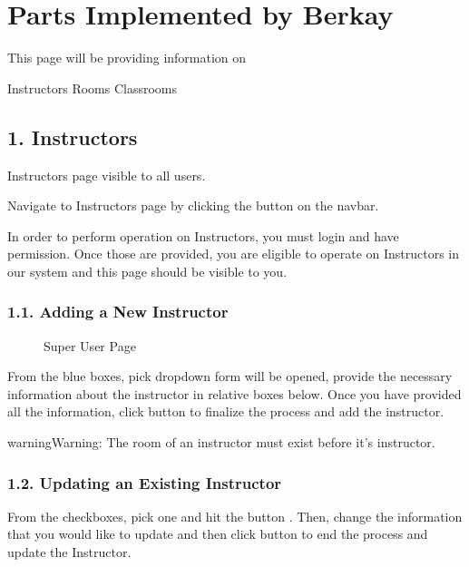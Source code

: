 \documentclass[letterpaper,10pt,english]{sphinxmanual}
\begin{document}
\section{Parts Implemented by Berkay}
\label{\detokenize{user/berkay:parts-implemented-by-berkay}}\label{\detokenize{user/berkay::doc}}
This page will be providing information on

Instructors
Rooms
Classrooms


\subsection{1. Instructors}
\label{\detokenize{user/berkay:instructors}}
Instructors page visible to all users.

Navigate to Instructors page by clicking the  button on the navbar.

In order to perform operation on Instructors, you must login and have permission.
Once those are provided, you are eligible to operate on Instructors in our system and this page should be
visible to you.


\subsubsection{1.1. Adding a New Instructor}
\label{\detokenize{user/berkay:adding-a-new-instructor}}
\begin{figure}[htbp]
\centering
\capstart

\noindent{}
\caption{Super User Page}\label{\detokenize{user/berkay:id1}}\end{figure}

From the blue boxes, pick  dropdown form will be opened, provide the necessary information
about the instructor in relative boxes below. Once you have provided all the information, click 
button to finalize the process and add the instructor.

\begin{sphinxadmonition}{warning}{Warning:}
The room of an instructor must exist before it’s instructor.
\end{sphinxadmonition}


\subsubsection{1.2. Updating an Existing Instructor}
\label{\detokenize{user/berkay:updating-an-existing-instructor}}
From the checkboxes, pick one and hit the button . Then, change the information that
you would like to update and then click  button to end the process and update the Instructor.
\end{document}
